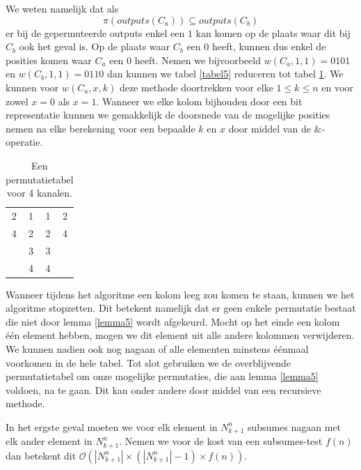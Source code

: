 \documentclass{article}
\begin{document}
We weten namelijk dat als \[{\pi\left(outputs\left(C_a\right)\right) \subseteq outputs\left(C_b\right)}\] er bij de gepermuteerde outputs enkel een $1$ kan komen op de plaats waar dit bij $C_b$ ook het geval is.
Op de plaats waar $C_b$ een $0$ heeft, kunnen dus enkel de posities komen waar $C_a$ een $0$ heeft.
Nemen we bijvoorbeeld $w\left(C_a,1,1\right) = 0101$ en ${w\left(C_b,1,1\right)=0110}$ dan kunnen we tabel \ref{tabel5} reduceren tot tabel \ref{tabel6}.
We kunnen voor $w\left(C_a, x, k\right)$ deze methode doortrekken voor elke $1 \leq k \leq n$ en voor zowel $x = 0$ als $x = 1$.
Wanneer we elke kolom bijhouden door een bit representatie kunnen we gemakkelijk de doorsnede van de mogelijke posities nemen na elke berekening voor een bepaalde $k$ en $x$ door middel van de $\&$-operatie. 
\begin{table}[!h]
	\centering
	\begin{tabular}{|c|c|c|c|}
	\hline
	2 & 1 & 1 & 2 \\ 
	4 & 2 & 2 & 4\\ 
	 & 3 & 3 &  \\
	 & 4 & 4 & \\ 
	\hline 
	\end{tabular}
	\caption{Een permutatietabel voor 4 kanalen.}
	\label{tabel6}
\end{table}

Wanneer tijdens het algoritme een kolom leeg zou komen te staan, kunnen we het algoritme stopzetten.
Dit betekent namelijk dat er geen enkele permutatie bestaat die niet door lemma \ref{lemma5} wordt afgekeurd.
Mocht op het einde een kolom \'e\'en element hebben, mogen we dit element uit alle andere kolommen verwijderen.
We kunnen nadien ook nog nagaan of alle elementen minstens \'e\'enmaal voorkomen in de hele tabel.
Tot slot gebruiken we de overblijvende permutatietabel om onze mogelijke permutaties, die aan lemma \ref{lemma5} voldoen, na te gaan. 
Dit kan onder andere door middel van een recursieve methode.

In het ergste geval moeten we voor elk element in $N^n_{k+1}$ subsumes nagaan met elk ander element in $N^n_{k+1}$.
Nemen we voor de kost van een subsumes-test $f(n)$ dan betekent dit $\mathcal{O}\left(|N^n_{k+1}| \times \left(|N^n_{k+1}|-1\right) \times f(n) \right) $.
\end{document}
